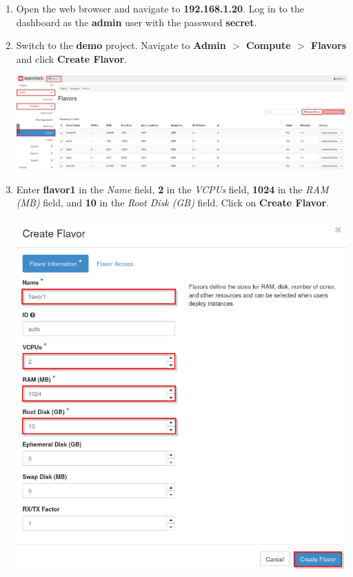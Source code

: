 \documentclass[letterpaper, 12pt]{article}
\begin{document}
\begin{enumerate}
    \item Open the web browser and navigate to \textbf{192.168.1.20}. Log in to the dashboard as the \textbf{admin} user
    with the password \textbf{secret}.
    
    \item Switch to the \textbf{demo} project. Navigate to \textbf{Admin $>$ Compute $>$ Flavors} and click
    \textbf{Create Flavor}.

    \begin{center}
        \includegraphics[width=\linewidth]{images/part2/step2.png}
    \end{center}

    \item Enter \textbf{flavor1} in the \textit{Name} field, \textbf{2} in the \textit{VCPUs} field, \textbf{1024} in
    the \textit{RAM (MB)} field, and \textbf{10} in the \textit{Root Disk (GB)} field. Click on \textbf{Create Flavor}.

    \begin{center}
        \includegraphics[width=\linewidth]{images/part2/step3.png}
    \end{center}


\end{enumerate}
\end{document}

